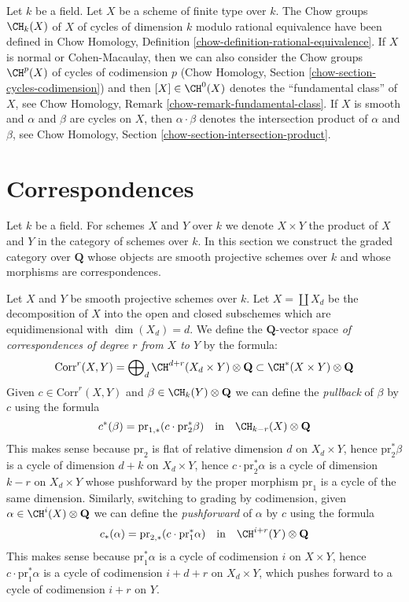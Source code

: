 \medskip\noindent
Let $k$ be a field. Let $X$ be a scheme of finite type over $k$.
The Chow groups $\CH_k(X)$ of $X$ of cycles of dimension $k$
modulo rational equivalence have been defined in
Chow Homology, Definition \ref{chow-definition-rational-equivalence}.
If $X$ is normal or Cohen-Macaulay, then we can also consider
the Chow groups $\CH^p(X)$ of cycles of codimension $p$
(Chow Homology, Section \ref{chow-section-cycles-codimension})
and then $[X] \in \CH^0(X)$ denotes the ``fundamental class'' of $X$, see
Chow Homology, Remark \ref{chow-remark-fundamental-class}.
If $X$ is smooth and $\alpha$ and $\beta$ are cycles on $X$,
then $\alpha \cdot \beta$ denotes the intersection product of
$\alpha$ and $\beta$, see
Chow Homology, Section \ref{chow-section-intersection-product}.













\section{Correspondences}
\label{section-correspondences}

\noindent
Let $k$ be a field. For schemes $X$ and $Y$ over $k$ we denote
$X \times Y$ the product of $X$ and $Y$ in the category of schemes
over $k$. In this section we construct the graded category over
$\mathbf{Q}$ whose objects are smooth projective schemes over $k$ and whose
morphisms are correspondences.

\medskip\noindent
Let $X$ and $Y$ be smooth projective schemes over $k$.
Let $X = \coprod X_d$ be the decomposition of $X$ into
the open and closed subschemes which are equidimensional
with $\dim(X_d) = d$. We define the $\mathbf{Q}$-vector space
{\it of correspondences of degree $r$ from $X$ to $Y$}
by the formula:
$$
\text{Corr}^r(X, Y) =
\bigoplus\nolimits_d \CH^{d + r}(X_d \times Y) \otimes \mathbf{Q}
\subset
\CH^*(X \times Y) \otimes \mathbf{Q}
$$
Given $c \in \text{Corr}^r(X, Y)$ and $\beta \in \CH_k(Y) \otimes \mathbf{Q}$
we can define the {\it pullback} of $\beta$ by $c$ using the formula
$$
c^*(\beta) = \text{pr}_{1, *}(c \cdot \text{pr}_2^*\beta)
\quad\text{in}\quad
\CH_{k - r}(X) \otimes \mathbf{Q}
$$
This makes sense because $\text{pr}_2$ is flat of relative dimension
$d$ on $X_d \times Y$, hence $\text{pr}_2^*\beta$ is a cycle of
dimension $d + k$ on $X_d \times Y$, hence $c \cdot \text{pr}_2^*\alpha$
is a cycle of dimension $k - r$ on $X_d \times Y$ whose pushforward
by the proper morphism $\text{pr}_1$ is a cycle of the same dimension.
Similarly, switching to grading by codimension,
given $\alpha \in \CH^i(X) \otimes \mathbf{Q}$ we can define the
{\it pushforward} of $\alpha$ by $c$ using the formula
$$
c_*(\alpha) = \text{pr}_{2, *}(c \cdot \text{pr}_1^*\alpha)
\quad\text{in}\quad
\CH^{i + r}(Y) \otimes \mathbf{Q}
$$
This makes sense because $\text{pr}_1^*\alpha$ is a cycle of codimension
$i$ on $X \times Y$, hence $c \cdot \text{pr}_1^*\alpha$ is a cycle
of codimension $i + d + r$ on $X_d \times Y$, which pushes forward
to a cycle of codimension $i + r$ on $Y$.

